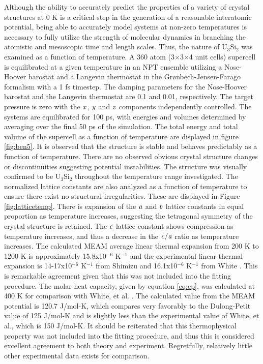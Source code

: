 \documentclass[review]{elsarticle}
\begin{document}
Although the ability to accurately predict the properties of a variety of crystal structures at 0 K is a critical step in the generation of a reasonable interatomic potential, being able to accurately model systems at non-zero temperatures is necessary to fully utilize the strength of molecular dynamics in branching the atomistic and mesoscopic time and length scales.  Thus, the nature of U$_{3}$Si$_{2}$ was examined as a function of temperature.  A 360 atom (3$\times$3$\times$4 unit cells) supercell is equilibrated at a given temperature in an NPT ensemble utilizing a Nose-Hoover barostat and a Langevin thermostat in the Gr{\o}nbech-Jensen-Farago \cite{gjf2013} formalism with a 1 fs timestep.  The damping parameters for the Nose-Hoover barostat and the Langevin thermostat are 0.1 and 0.01, respectively.  The target pressure is zero with the $\it{x}$, $\it{y}$ and $\it{z}$ components independently controlled. The systems are equilibrated for 100 ps, with energies and volumes determined by averaging over the final 50 ps of the simulation.  The total energy and total volume of the supercell as a function of temperature are displayed in figure \ref{fig:ben5}.  It is observed that the structure is stable and behaves predictably as a function of temperature.   There are no observed obvious crystal structure changes or discontinuities suggesting potential instabilities.  The structure was visually confirmed to be U$_{3}$Si$_{2}$ throughout the temperature range investigated.  The normalized lattice constants are also analyzed as a function of temperature to ensure there exist no structural irregularities.  These are displayed in Figure \ref{fig:latticetemp}.  There is expansion of the $\it{a}$ and $\it{b}$ lattice constants in equal proportion as temperature increases, suggesting the tetragonal symmetry of the crystal structure is retained.  The $\it{c}$ lattice constant shows compression as temperature increases, and thus a decrease in the $\it{c/a}$ ratio as temperature increases.  The calculated MEAM average linear thermal expansion from 200 K to 1200 K is approximately 15.8x10$^{-6}$ K$^{-1}$ and the experimental linear thermal expansion is 14-17x10$^{-6}$ K$^{-1}$ from Shimizu \cite{shimizu1965} and 16.1x10$^{-6}$ K$^{-1}$ from White \cite{white2015}.  This is remarkable agreement given that this was not included into the fitting procedure.  The molar heat capacity, given by equation \ref{eq:cp}, was calculated at 400 K for comparison with White, et al. \cite{white2015}.  The calculated value from the MEAM potential is 120.7 J/mol-K, which compares very favorably to the Dulong-Petit value of 125 J/mol-K and is slightly less than the experimental value of White, et al., which is 150 J/mol-K.  It should be reiterated that this thermophysical property was not included into the fitting procedure, and thus this is considered excellent agreement to both theory and experiment.  Regretfully, relatively little other experimental data exists for comparison.  
\end{document}
